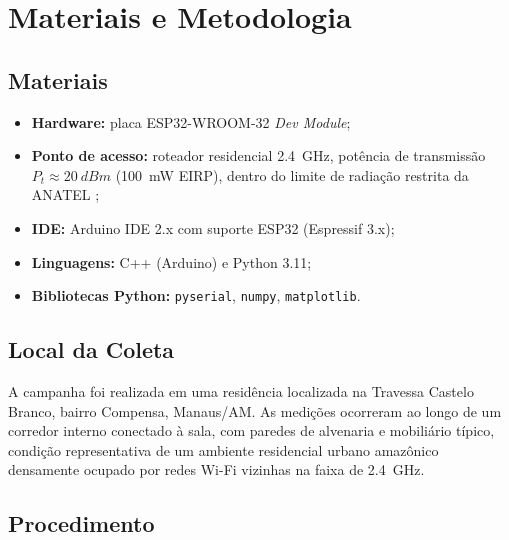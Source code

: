 \documentclass[
  12pt,
  a4paper,
  oneside,
  brazil,
  chapter=TITLE,
  section=TITLE,
]{abntex2}
\begin{document}
\chapter{Materiais e Metodologia}

\section{Materiais}

\begin{itemize}
  \item \textbf{Hardware:} placa ESP32-WROOM-32 \textit{Dev Module};
  \item \textbf{Ponto de acesso:} roteador residencial \SI{2.4}{\giga\hertz},
        pot\^encia de transmiss\~ao $P_t \approx \SI{20}{dBm}$
        (\SI{100}{\milli\watt} EIRP), dentro do limite de radia\c{c}\~ao
        restrita da ANATEL \cite{anatel2017};
  \item \textbf{IDE:} Arduino IDE 2.x com suporte ESP32 (Espressif 3.x);
  \item \textbf{Linguagens:} C++ (Arduino) e Python 3.11;
  \item \textbf{Bibliotecas Python:} \texttt{pyserial}, \texttt{numpy},
        \texttt{matplotlib}.
\end{itemize}

\section{Local da Coleta}

A campanha foi realizada em uma resid\^encia localizada na Travessa Castelo
Branco, bairro Compensa, Manaus/AM. As medi\c{c}\~oes ocorreram ao longo de um
corredor interno conectado \`a sala, com paredes de alvenaria e mobili\'ario
t\'ipico, condi\c{c}\~ao representativa de um ambiente residencial urbano
amaz\^onico densamente ocupado por redes Wi-Fi vizinhas na faixa de
\SI{2.4}{\giga\hertz}.

\section{Procedimento}
\end{document}
